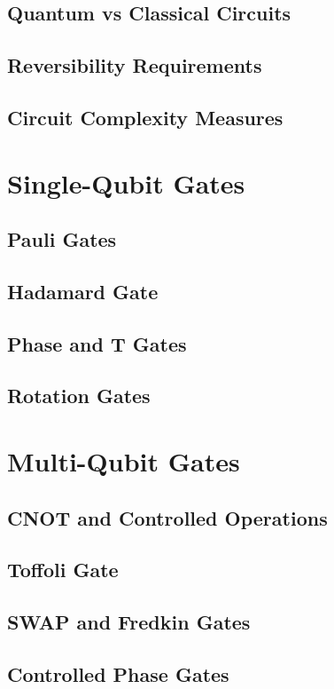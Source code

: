 \documentclass[12pt,a4paper]{book}
\begin{document}
\subsection{Quantum vs Classical Circuits}
\subsection{Reversibility Requirements}
\subsection{Circuit Complexity Measures}

\section{Single-Qubit Gates}
\subsection{Pauli Gates}
\subsection{Hadamard Gate}
\subsection{Phase and T Gates}
\subsection{Rotation Gates}

\section{Multi-Qubit Gates}
\subsection{CNOT and Controlled Operations}
\subsection{Toffoli Gate}
\subsection{SWAP and Fredkin Gates}
\subsection{Controlled Phase Gates}
\end{document}
